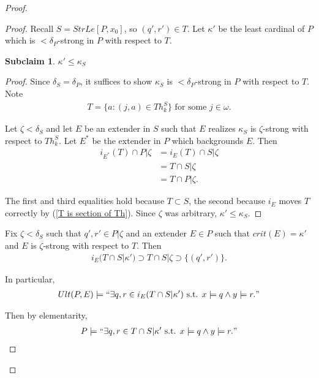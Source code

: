 \documentclass[12pt]{article}
\newtheorem{subclaim}[theorem]{Subclaim}
\begin{document}
{\begin{proof}
\begin{proof}
        Recall $S = StrLe[P,x_0]$, so $(q',r')\in T$. Let $\kappa'$ be the least cardinal of $P$ which is $<\delta_P$-strong in $P$ with respect to $T$.

        \begin{subclaim}
            $\kappa'\leq\kappa_S$
        \end{subclaim}
        \begin{proof}
            Since $\delta_S = \delta_P$, it suffices to show $\kappa_S$ is $<\delta_P$-strong in $P$ with respect to $T$. Note             
            \begin{align}
                \label{T is section of Th} T = \{a: (j,a)\in Th^S_k\} \text{ for some } j\in \omega.
            \end{align}

            Let $\zeta < \delta_S$ and let $E$ be an extender in $S$ such that $E$ realizes $\kappa_S$ is $\zeta$-strong with respect to $Th^S_k$. Let $E^*$ be the extender in $P$ which backgrounds $E$. Then
            \begin{align*}
                i_{E^*}(T) \cap P|\zeta &= i_E(T) \cap S|\zeta\\
                &= T\cap S|\zeta\\
                &= T\cap P|\zeta.
            \end{align*}

            The first and third equalities hold because $T\subset S$, the second because $i_E$ moves $T$ correctly by (\ref{T is section of Th}). Since $\zeta$ was arbitrary, $\kappa'\leq \kappa_S$.
        \end{proof}

        Fix $\zeta < \delta_S$ such that $q',r'\in P|\zeta$ and an extender $E\in P$ such that $crit(E) = \kappa'$ and $E$ is $\zeta$-strong with respect to $T$. Then
        \begin{align*}
            i_E(T\cap S|\kappa') \supset T \cap S|\zeta \supset \{(q',r')\}.
        \end{align*}

        In particular,
        \begin{align*}
            Ult(P,E) \models ``\exists q,r\in i_E(T\cap S|\kappa') \text{ s.t. } x\models q \wedge y \models r."
        \end{align*}

        Then by elementarity,
        \begin{align*}
            P \models ``\exists q,r\in T\cap S|\kappa' \text{ s.t. } x\models q \wedge y \models r."
        \end{align*}            
    \end{proof}


\end{proof}}
\end{document}
